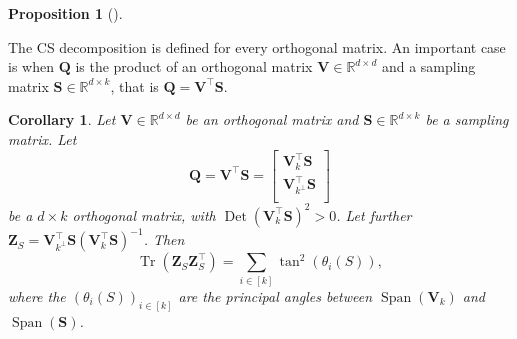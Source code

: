 \documentclass[twoside,11pt]{book}
\newtheorem{corollary}{Corollary}
\newtheorem{proposition}{Proposition}
\numberwithin{theorem}{chapter}
\numberwithin{definition}{chapter}
\numberwithin{proposition}{chapter}
\numberwithin{corollary}{chapter}
\numberwithin{example}{chapter}
\numberwithin{lemma}{chapter}
\numberwithin{assumption}{chapter}
\numberwithin{equation}{chapter}
\numberwithin{figure}{chapter}
\DeclareMathOperator{\Tr}{Tr}
\DeclareMathOperator{\Det}{Det}
\DeclareMathOperator{\Span}{\mathrm{Span}}
\DeclareMathOperator{\Tran}{\intercal}
\begin{document}
\begin{subappendices}
\begin{proposition}[\citealp{GoVa96}]
\label{CSD_proposition}
\end{proposition}
The CS decomposition is defined for every orthogonal matrix. An important case is when $\bm{Q}$ is the product of an orthogonal matrix $\bm{V} \in \mathbb{R}^{d \times d}$ and a sampling matrix $\bm{S} \in \mathbb{R}^{d \times k}$, that is $\bm{Q} = \bm{V}^{\Tran}\bm{S}$.

\begin{corollary}\label{corollary:tangent_of_principal_angles}
Let $\bm{V} \in \mathbb{R}^{d \times d}$ be an orthogonal matrix and $\bm{S} \in \mathbb{R}^{d \times k}$ be a sampling matrix. Let
\begin{equation}
\bm{Q} = \bm{V}^{\Tran}\bm{S} = \left[
\begin{array}{c}
\bm{V}_{k}^{\Tran} \bm{S}\\
\hline
\bm{V}_{k^{\perp}}^{\Tran} \bm{S}\\
\end{array}
\right]
\end{equation}
be a $d \times k$ orthogonal matrix, with $\Det(\bm{V}_{k}^{\Tran} \bm{S})^{2} > 0$. Let further $\bm{Z}_{S} = \bm{V}_{k^{\perp}}^{\Tran} \bm{S}(\bm{V}_{k}^{\Tran}\bm{S})^{-1}$. Then
\begin{equation}\label{eq:trace_tan_relationship}
\Tr(\bm{Z}_{S}^{}\bm{Z}_{S}^{\Tran}) = \sum\limits_{i \in [k]} \tan^{2}(\theta_{i}(S)),
\end{equation}
where the $(\theta_{i}(S))_{i \in [k]}$ are the principal angles between $\Span(\bm{V}_{k})$ and $\Span(\bm{S})$.
\end{corollary}


\end{subappendices}
\end{document}
